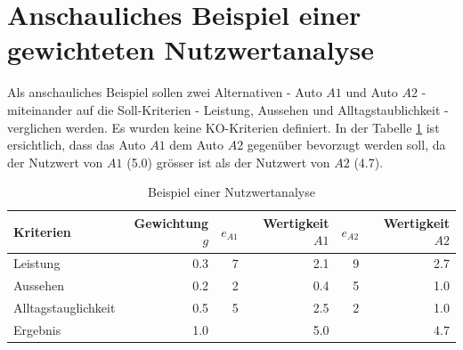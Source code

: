   \section{Anschauliches Beispiel einer gewichteten Nutzwertanalyse}
  
  Als anschauliches Beispiel sollen zwei Alternativen - Auto \(A1\) und Auto
  \(A2\) - miteinander auf die Soll-Kriterien - Leistung, Aussehen und
  Alltagstaublichkeit - verglichen werden. Es wurden keine KO-Kriterien
  definiert. In der Tabelle \ref{tab:beispielNwa} ist ersichtlich, dass das
  Auto \(A1\) dem Auto \(A2\) gegenüber bevorzugt werden soll, da der Nutzwert
  von \(A1\) (5.0) grösser ist als der Nutzwert von \(A2\) (4.7).
  \newline
  
  \begin{table}[h!]
    \sffamily 
    \begin{center}
      \begin{tabular}{lrrrrr}
        \toprule
        \textbf{Kriterien} & \textbf{Gewichtung \(g\)} & \textbf{\(e_{A1}\)} &
        \textbf{Wertigkeit \(A1\)} & \textbf{\(e_{A2}\)} & \textbf{Wertigkeit
        \(A2\)}\\
        \midrule
        Leistung            & 0.3 & 7 & 2.1 & 9 & 2.7 \\
        Aussehen            & 0.2 & 2 & 0.4 & 5 & 1.0 \\
        Alltagstauglichkeit & 0.5 & 5 & 2.5 & 2 & 1.0 \\
        \midrule
        \midrule
        Ergebnis            & 1.0 &   & 5.0 &   & 4.7 \\
        \bottomrule
      \end{tabular}
      \caption{Beispiel einer Nutzwertanalyse}
      \label{tab:beispielNwa}
    \end{center}
  \end{table}
  
